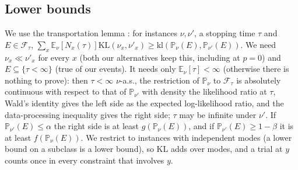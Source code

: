 \documentclass{article}
\newcommand{\KL}{\mathrm{KL}}
\newcommand{\kl}{\mathrm{kl}}
\newcommand{\E}{\mathbb{E}}
\renewcommand{\P}{\mathbb{P}}
\begin{document}
\subsection{Lower bounds}
We use the transportation lemma \citep[Lemma~1]{kaufmann2016complexity}: for
instances $\nu,\nu'$, a stopping time $\tau$ and $E\in\mathcal F_\tau$,
$\sum_x\E_\nu[N_x(\tau)]\KL(\nu_x,\nu'_x)\ge\kl(\P_\nu(E),\P_{\nu'}(E))$.
We need $\nu_x\ll\nu'_x$ for every $x$ (both our alternatives keep this,
including at $p=0$) and $E\subseteq\{\tau<\infty\}$ (true of our events).
It needs only $\E_\nu[\tau]<\infty$ (otherwise there is nothing to prove):
then $\tau<\infty$ $\nu$-a.s., the restriction of $\P_\nu$ to
$\mathcal F_\tau$ is absolutely continuous with respect to that of
$\P_{\nu'}$ with density the likelihood ratio at $\tau$, Wald's identity
gives the left side as the expected log-likelihood ratio, and the
data-processing inequality gives the right side; $\tau$ may be infinite
under $\nu'$. If $\P_{\nu'}(E)\le\alpha$ the right side is at least
$g(\P_\nu(E))$, and if $\P_{\nu'}(E)\ge1-\beta$ it is at least
$f(\P_\nu(E))$. We restrict to instances with independent modes (a lower
bound on a subclass is a lower bound), so KL adds over modes, and a trial
at $y$ counts once in every constraint that involves $y$.
\end{document}
